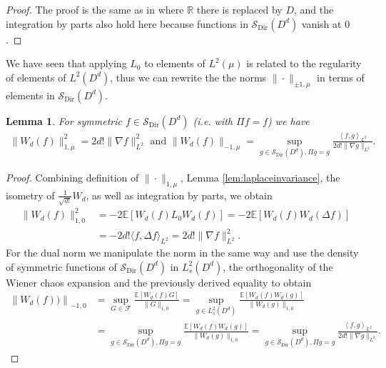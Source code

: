 \documentclass[a4paper, reqno, 12pt]{amsart}
\theoremstyle{plain}
\newtheorem{lemma}[definition]{Lemma}
\theoremstyle{definition}
\newcommand{\Sdir}{\mathcal{S}_{\text{Dir}}}
\begin{document}
\begin{proof} 
The proof is the same as in \cite[Lemma 3.7]{GP18} where $\mathbb R$ there is replaced by $D$, and  the integration by parts also hold  here because functions in $\Sdir (D^d)$ vanish at $0$.
\end{proof}


We have seen that applying $L_0$ to elements of $L^2(\mu)$ is related to the regularity of elements of $L^2(D^d)$, thus we can rewrite the the norms $\|\cdot\|_{\pm 1,\mu}$ in terms of elements in $\Sdir(D^d)$.

\begin{lemma} \label{lem:sobolevchaos}
For symmetric $f\in\Sdir(D^d)$ (i.e. with $\Pi f = f$) we have
\begin{align*}
    \|W_d(f)\|_{1,\mu}^2 = 2 d!\|\nabla f\|_{L^2}^2 \text{ and } \|W_d(f)\|_{-1,\mu} = \sup_{g\in \Sdir(D^d), \Pi g=g}\frac{\left\langle f,g\right\rangle_{L^2 } }{2d!\|\nabla g\|_{L^2 }}.
\end{align*}
\end{lemma}
\begin{proof}
    Combining definition of $\|\cdot\|_{1,\mu}$, Lemma \ref{lem:laplaceinvariance}, the isometry of $\frac{1}{\sqrt{d !}}W_d$, as well as integration by parts, we obtain 
    \begin{align*}
        \|W_d(f)\|_{1,0}^2 & = -2\mathbb E \left[W_d(f)L_0W_d(f) \right]= -2\mathbb E\left[W_d(f)W_d(\Delta f)\right]\\
        & = -2d!\langle f,\Delta f\rangle_{L^2 }= 2 d!\|\nabla f\|_{L^2}^2.
    \end{align*}
For the dual norm we manipulate the norm in the same way and use the density of symmetric functions of $\Sdir(D^d)$ in $L^2_s(D^d)$, the orthogonality of the Wiener chaos expansion and the previously derived equality to obtain
    \begin{align*} 
         \left\|W_d\left( f\right)) \right\|_{-1,0} &=  \sup_{G\in \mathcal F}\frac{\mathbb E\left[ W_d\left(f\right)G \right]}{\|G\|_{1,0}}  =  \sup_{g\in L^2_s(D^d)}\frac{\mathbb E [W_d\left(f\right) W_d(g)]}{\|W_d(g)\|_{1,0}}\\
        & =  \sup_{g\in \Sdir(D^d), \Pi g=g}\frac{\mathbb E\left[ W_d\left(f\right) W_d(g)\right]}{\|W_d(g)\|_{1,0}} =  \sup_{g\in \Sdir(D^d), \Pi g=g}\frac{\left\langle f,g\right\rangle_{L^2} }{2d!\|\nabla g\|_{L^2}} .
    \end{align*}

\end{proof}
\end{document}
